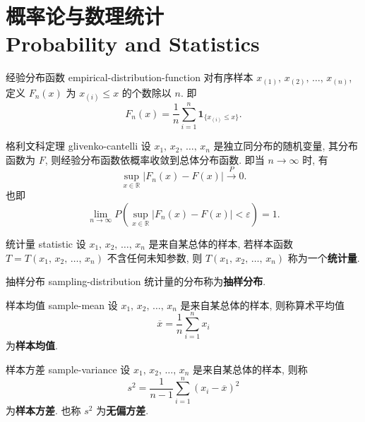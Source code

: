 \section{概率论与数理统计 \\Probability and Statistics}

\begin{newdefbox}{经验分布函数 }{empirical-distribution-function}
	对有序样本 $x_{(1)},\,x_{(2)},\,\dots,\,x_{(n)}$, 定义 $F_n(x)$ 为 $x_{(i)}\leq x$ 的个数除以 $n$.  即
	\[
		F_n(x)=\frac{1}{n}\sum_{i=1}^n\mathbf{1}_{\{x_{(i)}\leq x\}}.
		\]
\end{newdefbox}

\begin{newtheorembox}{格利文科定理 }{glivenko-cantelli}
	设 $x_1,\,x_2,\,\dots,\,x_n$ 是独立同分布的随机变量, 其分布函数为 $F$, 则经验分布函数依概率收敛到总体分布函数.  即当 $n\to\infty$ 时, 有
	\[
		\sup_{x\in\mathbb{R}}|F_n(x)-F(x)|\xrightarrow{P}0.
	\]
	也即
	\[
		\lim_{n\to\infty}P\left(\sup_{x\in\mathbb{R}}|F_n(x)-F(x)|<\varepsilon\right)=1.
	\]
\end{newtheorembox}

\begin{newdefbox}{统计量 }{statistic}
	设 $x_1,\,x_2,\,\dots,\,x_n$ 是来自某总体的样本, 若样本函数 $T=T(x_1,\,x_2,\,\dots,\,x_n)$ 不含任何未知参数, 则 $T(x_1,\,x_2,\,\dots,\,x_n)$ 称为一个\textbf{统计量}.
\end{newdefbox}

\begin{newdefbox}{抽样分布 }{sampling-distribution}
	统计量的分布称为\textbf{抽样分布}.
\end{newdefbox}

\begin{newdefbox}{样本均值 }{sample-mean}
	设 $x_1,\,x_2,\,\dots,\,x_n$ 是来自某总体的样本, 则称算术平均值
	\[
		\overline{x}=\frac{1}{n}\sum_{i=1}^nx_i
	\]
	为\textbf{样本均值}.
\end{newdefbox}

\begin{newdefbox}{样本方差 }{sample-variance}
	设 $x_1,\,x_2,\,\dots,\,x_n$ 是来自某总体的样本, 则称
	\[
		s^2=\frac{1}{n-1}\sum_{i=1}^n(x_i-\overline{x})^2
	\]
	为\textbf{样本方差}.  也称 $s^2$ 为\textbf{无偏方差}.
\end{newdefbox}

